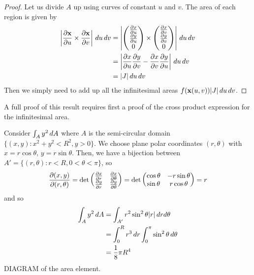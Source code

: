 \documentclass{../../template/note}
\begin{document}
    \begin{proof}
        Let us divide \(A\) up using curves of constant \(u\) and \(v\). The area of each region is given by
        \begin{align*}
            \left|\pd{\V x}{u} \times \pd{\V x}{v}\right|\D u \D v &= \left|\begin{pmatrix}
             \pd x u \\
             \pd y u \\
             0 \\
            \end{pmatrix} \times \begin{pmatrix}
             \pd x v \\
             \pd y v \\
             0 \\
            \end{pmatrix}\right|\D u \D v \\
            &= \left|\pd x u \pd y v - \pd x v \pd y u\right|\D u \D v \\
            &= |J| \D u \D v
        \end{align*}
        Then we simply need to add up all the infinitesimal areas \(f(\V x(u, v)) |J| \D u \D v\).
    \end{proof}
    
    \begin{remark*}
        A full proof of this result requires first a proof of the cross product expression for the infinitesimal area.
    \end{remark*}
    
    \begin{example*}
        Consider \(\int_A y^2 \,d{A}\) where \(A\) is the semi-circular domain \(\{(x, y): x^2 + y^2 < R^2, y > 0\}\). We choose plane polar coordinates \((r, \theta)\) with \(x = r \cos \theta\), \(y = r \sin \theta\). Then, we have a bijection between \(A' = \{(r, \theta): r < R, 0 < \theta < \pi\}\), so
        \begin{align*}
            \pd{(x, y)}{(r, \theta)} = \det \begin{pmatrix}
                \pd x r & \pd x \theta \\
                \pd y r & \pd y \theta \\
            \end{pmatrix} = \det \begin{pmatrix}
                \cos \theta & -r \sin \theta \\
                \sin \theta & r \cos \theta \\
            \end{pmatrix} = r
        \end{align*}
        and so
        \begin{align*}
            \int_A y^2 \,d{A} &= \int_{A'} r^2 \sin^2 \theta |r| \,d{r} d\theta \\
            &= \int_0^R r^3 \,d{r} \int_0^\pi \sin^2 \theta \,d{\theta} \\
            &= \frac 1 8 \pi R^4
        \end{align*}
        DIAGRAM of the area element.        
    \end{example*}
    
\end{document}
